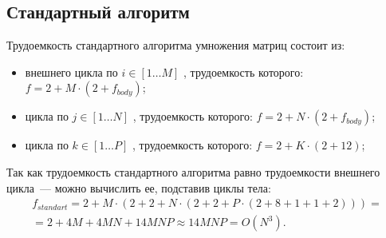 \subsection{Стандартный алгоритм}
Трудоемкость стандартного алгоритма умножения матриц состоит из:
\begin{itemize}
	\item внешнего цикла по $i \in [1 \ldots M]$ , трудоемкость которого: $f = 2 + M \cdot (2 + f_{body})$;
	\item цикла по $j \in [1 \ldots N]$ , трудоемкость которого: $f = 2 + N \cdot (2 + f_{body})$;
	\item цикла по $k \in [1 \ldots P]$ , трудоемкость которого: $f = 2 + K \cdot (2 + 12)$;
\end{itemize}
Так как трудоемкость стандартного алгоритма равно трудоемкости внешнего цикла~--- можно вычислить ее, подставив циклы тела:
\begin{equation}
	\begin{gathered}
		f_{standart} = 2 + M \cdot (2 + 2 + N \cdot (2 + 2 + P \cdot (2 + 8 + 1 + 1 + 2))) = \\
		= 2 + 4M + 4MN + 14MNP \approx 14MNP = O(N^3).
	\end{gathered}
\end{equation}

